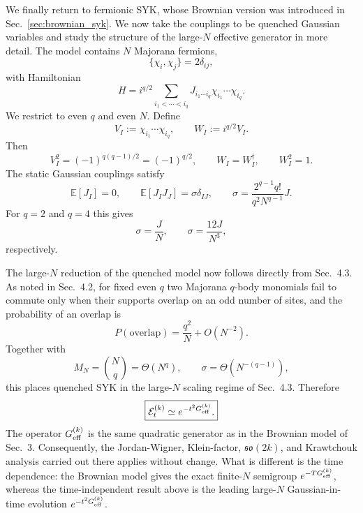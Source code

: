 \documentclass{article}
\theoremstyle{definition}
\begin{document}
We finally return to fermionic SYK, whose Brownian version was introduced in
Sec.~\ref{sec:brownian_syk}.  We now take the couplings to be quenched
Gaussian variables and study the structure of the large-$N$ effective
generator in more detail.  The model contains $N$ Majorana fermions,
\begin{equation}
    \{\chi_i,\chi_j\}=2\delta_{ij},
\end{equation}
with Hamiltonian
\begin{equation}
    H
    =i^{q/2}\sum_{i_1<\cdots<i_q}
    J_{i_1\cdots i_q}\chi_{i_1}\cdots\chi_{i_q}.
\end{equation}
We restrict to even $q$ and even $N$.  Define
\begin{equation}
    V_I:=\chi_{i_1}\cdots\chi_{i_q},
    \qquad
    W_I:=i^{q/2}V_I.
\end{equation}
Then
\begin{equation}
    V_I^2=(-1)^{q(q-1)/2}=(-1)^{q/2},
    \qquad
    W_I=W_I^\dagger,
    \qquad
    W_I^2=1.
\end{equation}
The static Gaussian couplings satisfy
\begin{equation}
    \mathbb E[J_I]=0,
    \qquad
    \mathbb E[J_IJ_J]=\sigma\delta_{IJ},
    \qquad
    \sigma=\frac{2^{q-1}q!}{q^2N^{q-1}}J.
\end{equation}
For $q=2$ and $q=4$ this gives
\begin{equation}
    \sigma=\frac{J}{N},
    \qquad
    \sigma=\frac{12J}{N^3},
\end{equation}
respectively. 

The large-$N$ reduction of the quenched model now follows directly from
Sec.~4.3.  As noted in Sec.~4.2, for fixed even $q$ two Majorana $q$-body
monomials fail to commute only when their supports overlap on an odd number
of sites, and the probability of an overlap is
\begin{equation}
    P(\mathrm{overlap})
    =\frac{q^2}{N}+O(N^{-2}).
\end{equation}
Together with
\begin{equation}
    M_N=\binom Nq=\Theta(N^q),
    \qquad
    \sigma=\Theta(N^{-(q-1)}),
\end{equation}
this places quenched SYK in the large-$N$ scaling regime of Sec.~4.3.
Therefore
\begin{equation}
    \boxed{
    {\cal E}^{(k)}_t
    \simeq
    e^{-t^2G_{\rm eff}^{(k)}}.
    }
\end{equation}
The operator $G_{\rm eff}^{(k)}$ is the same quadratic generator as in the
Brownian model of Sec.~3.  Consequently, the Jordan-Wigner, Klein-factor,
$\mathfrak{so}(2k)$, and Krawtchouk analysis carried out there applies
without change.  What is different is the time dependence: the Brownian
model gives the exact finite-$N$ semigroup $e^{-TG_{\rm eff}^{(k)}}$,
whereas the time-independent result above is the leading large-$N$
Gaussian-in-time evolution $e^{-t^2G_{\rm eff}^{(k)}}$.
\end{document}

